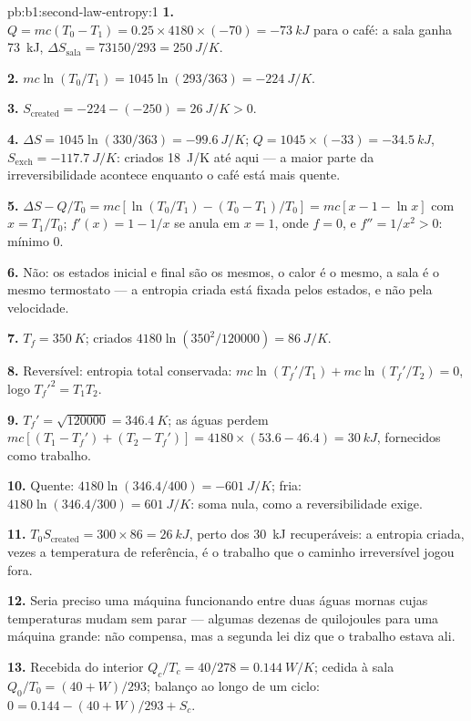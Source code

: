 \begin{solution}{pb:b1:second-law-entropy:1}
\textbf{1.} $Q = mc(T_0 - T_1) = 0.25 \times 4180 \times (-70) = \qty{-73}{kJ}$
para o café: a sala ganha \qty{73}{kJ}, $\Delta S_{\text{sala}} = 73150/293
= \qty{+250}{J/K}$.

\textbf{2.} $mc\ln(T_0/T_1) = 1045\ln(293/363) = \qty{-224}{J/K}$.

\textbf{3.} $S_{\mathrm{created}} = -224 - (-250) = \qty{+26}{J/K} > 0$.

\textbf{4.} $\Delta S = 1045\ln(330/363) = \qty{-99.6}{J/K}$; $Q = 1045 \times
(-33) = \qty{-34.5}{kJ}$, $S_{\mathrm{exch}} = \qty{-117.7}{J/K}$: criados
\qty{18}{J/K} até aqui --- a maior parte da irreversibilidade acontece
enquanto o café está mais quente.

\textbf{5.} $\Delta S - Q/T_0 = mc[\ln(T_0/T_1) - (T_0 - T_1)/T_0] = mc[x - 1 -
\ln x]$ com $x = T_1/T_0$; $f'(x) = 1 - 1/x$ se anula em $x = 1$, onde
$f = 0$, e $f'' = 1/x^2 > 0$: mínimo $0$.

\textbf{6.} Não: os estados inicial e final são os mesmos, o calor é o
mesmo, a sala é o mesmo termostato --- a entropia criada está fixada pelos
estados, e não pela velocidade.

\textbf{7.} $T_f = \qty{350}{K}$; criados $4180\ln(350^2/120000) = \qty{86}{J/K}$.

\textbf{8.} Reversível: entropia total conservada: $mc\ln(T_f'/T_1) + mc\ln(T_f'/
T_2) = 0$, logo $T_f'^2 = T_1T_2$.

\textbf{9.} $T_f' = \sqrt{120000} = \qty{346.4}{K}$; as águas perdem $mc[(T_1 -
T_f') + (T_2 - T_f')] = 4180 \times (53.6 - 46.4) = \qty{30}{kJ}$, fornecidos como
trabalho.

\textbf{10.} Quente: $4180\ln(346.4/400) = \qty{-601}{J/K}$; fria: $4180\ln(346.4/
300) = \qty{+601}{J/K}$: soma nula, como a reversibilidade exige.

\textbf{11.} $T_0S_{\mathrm{created}} = 300 \times 86 = \qty{26}{kJ}$, perto dos
\qty{30}{kJ} recuperáveis: a entropia criada, vezes a temperatura de
referência, é o trabalho que o caminho irreversível jogou fora.

\textbf{12.} Seria preciso uma máquina funcionando entre duas águas mornas
cujas temperaturas mudam sem parar --- algumas dezenas de quilojoules para
uma máquina grande: não compensa, mas a segunda lei diz que o trabalho
estava ali.

\textbf{13.} Recebida do interior $Q_c/T_c = 40/278 = \qty{0.144}{W/K}$;
cedida à sala $Q_0/T_0 = (40 + W)/293$; balanço ao longo de um ciclo:
$0 = 0.144 - (40 + W)/293 + S_c$.


\end{solution}
